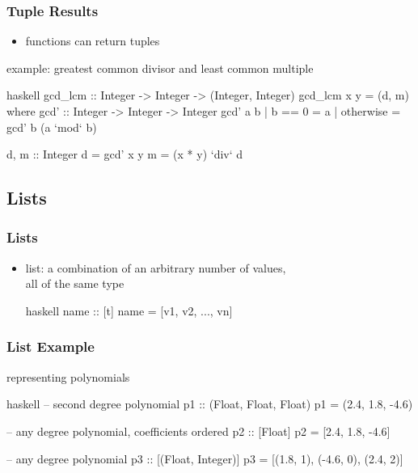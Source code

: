 \documentclass[dvipsnames]{beamer}
\theoremstyle{plain}
\begin{document}
\begin{frame}[fragile]
  \frametitle{Tuple Results}

  \begin{itemize}
    \item functions can return tuples
  \end{itemize}

  \begin{exampleblock}{example: greatest common divisor
                            and least common multiple}
    \begin{pygments}{haskell}
gcd_lcm :: Integer -> Integer -> (Integer, Integer)
gcd_lcm x y = (d, m)
  where
    gcd' :: Integer -> Integer -> Integer
    gcd' a b
      | b == 0    = a
      | otherwise = gcd' b (a `mod` b)

    d, m :: Integer
    d = gcd' x y
    m = (x * y) `div` d
    \end{pygments}
  \end{exampleblock}
\end{frame}

\subsection{Lists}

\begin{frame}[fragile]
  \frametitle{Lists}

  \begin{itemize}
    \item \alert{list}: a combination of an arbitrary number of values,\\
      all of the same type
    \begin{block}{}
      \begin{pygments}{haskell}
name :: [t]
name = [v1, v2, ..., vn]
      \end{pygments}
    \end{block}
  \end{itemize}
\end{frame}

\begin{frame}[fragile]
  \frametitle{List Example}

  \begin{exampleblock}{representing polynomials}
    \begin{pygments}{haskell}
-- second degree polynomial
p1 :: (Float, Float, Float)
p1 = (2.4, 1.8, -4.6)

-- any degree polynomial, coefficients ordered
p2 :: [Float]
p2 = [2.4, 1.8, -4.6]

-- any degree polynomial
p3 :: [(Float, Integer)]
p3 = [(1.8, 1), (-4.6, 0), (2.4, 2)]
    \end{pygments}
  \end{exampleblock}
\end{frame}
\end{document}
